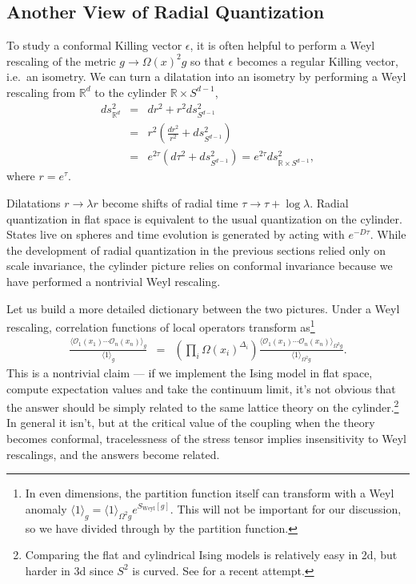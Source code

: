 \documentclass[11pt]{ws-rv9x6}
\newcommand\be{\begin{eqnarray}}
\newcommand\ee{\end{eqnarray}}
\newcommand\cO{\mathcal{O}}
\newcommand\p[1]{\left(#1\right)}
\newcommand\e\epsilon
\newcommand\<\langle
\renewcommand\>\rangle
\newcommand\R{\mathbb{R}}
\newcommand\nn{\nonumber}
\renewcommand\.{\cdot}
\newcommand\x\times
\newcommand\De{\Delta}
\renewcommand\l\lambda
\begin{document}
\subsection{Another View of Radial Quantization}

To study a conformal Killing vector $\e$, it is often helpful to perform a Weyl rescaling of the metric $g\to \Omega(x)^2 g$ so that $\e$ becomes a regular Killing vector, i.e.\ an isometry.  We can turn a dilatation into an isometry by performing a Weyl rescaling from $\R^d$ to the cylinder $\R\x S^{d-1}$,
\be
ds_{\R^d}^2 &=& dr^2 + r^2 ds_{S^{d-1}}^2\nn\\
&=& r^2\p{\frac{dr^2}{r^2} + ds_{S^{d-1}}^2}\nn\\
&=& e^{2\tau}(d\tau^2 + ds_{S^{d-1}}^2) = e^{2\tau} ds_{\R\x S^{d-1}}^2,
\ee
where $r=e^\tau$.

Dilatations $r\to\l r$ become shifts of radial time $\tau\to\tau+\log \l$.  Radial quantization in flat space is equivalent to the usual quantization on the cylinder.  States live on spheres and time evolution is generated by acting with $e^{-D\tau}$.  While the development of radial quantization in the previous sections relied only on scale invariance, the cylinder picture relies on conformal invariance because we have performed a nontrivial Weyl rescaling.

Let us build a more detailed dictionary between the two pictures.  Under a Weyl rescaling, correlation functions of local operators transform as\footnote{In even dimensions, the partition function itself can transform with a Weyl anomaly $\<1\>_g=\<1\>_{\Omega^2 g}e^{S_\mathrm{Weyl}[g]}$.  This will not be important for our discussion, so we have divided through by the partition function.}
\be
\label{eq:weyltransformation}
\frac{\<\cO_1(x_1)\cdots\cO_n(x_n)\>_g}{\<1\>_g} &=& \p{\prod_i \Omega(x_i)^{\De_i}}\frac{\<\cO_1(x_1)\cdots\cO_n(x_n)\>_{\Omega^2g}}{\<1\>_{\Omega^2 g}}.
\ee
This is a nontrivial claim --- if we implement the Ising model in flat space, compute expectation values and take the continuum limit, it's not obvious that the answer should be simply related to the same lattice theory on the cylinder.\footnote{Comparing the flat and cylindrical Ising models is relatively easy in 2d, but harder in 3d since $S^2$ is curved. See \cite{Brower:2014gsa} for a recent attempt.}    In general it isn't, but at the critical value of the coupling when the theory becomes conformal, tracelessness of the stress tensor implies insensitivity to Weyl rescalings, and the answers become related.
\end{document}
